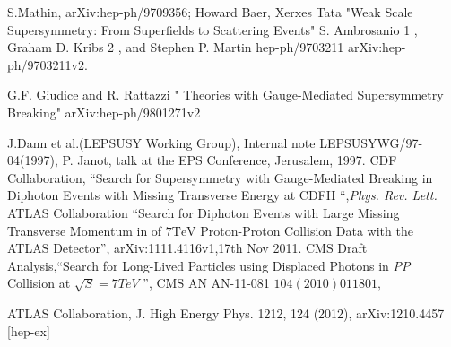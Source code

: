 \begin{thebibliography}{9}
 S.Mathin, arXiv:hep-ph/9709356;
 Howard Baer, Xerxes Tata "Weak Scale Supersymmetry: From Superfields to Scattering Events"
 S. Ambrosanio 1 , Graham D. Kribs 2 , and Stephen P. Martin hep-ph/9703211 arXiv:hep-ph/9703211v2.



G.F. Giudice and R. Rattazzi " Theories with Gauge-Mediated Supersymmetry Breaking" arXiv:hep-ph/9801271v2










J.Dann et al.(LEPSUSY Working Group), Internal note LEPSUSYWG/97-04(1997), P. Janot, talk at the EPS Conference, Jerusalem, 1997.
CDF Collaboration, ``Search for Supersymmetry with Gauge-Mediated Breaking in Diphoton Events with Missing Transverse Energy at CDFII ``,\emph{Phys. Rev. Lett.}
 ATLAS Collaboration ``Search for Diphoton Events with Large Missing Transverse Momentum in  of $\text{7TeV}$ Proton-Proton Collision Data with the ATLAS Detector'', arXiv:1111.4116v1,17th Nov 2011. 
CMS Draft Analysis,``Search for Long-Lived Particles using Displaced Photons in \emph{PP} Collision at $\sqrt{S}=7TeV$ '', CMS AN AN-11-081 \emph{$104(2010) 011801,$}

ATLAS Collaboration, J. High Energy Phys. 1212, 124
(2012), arXiv:1210.4457 [hep-ex]


\end{thebibliography}
